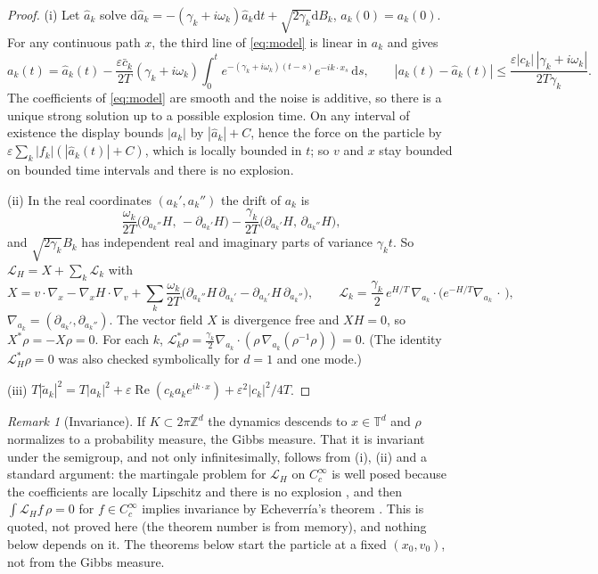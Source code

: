 \documentclass[11pt]{article}
\newcommand{\dd}{\mathrm{d}}
\newcommand{\eps}{\varepsilon}
\newcommand{\cL}{\mathcal{L}}
\renewcommand{\Re}{\operatorname{Re}}
\theoremstyle{remark}
\newtheorem{remark}[theorem]{Remark}
\begin{document}
\begin{proof}
(i) Let $\hat a_k$ solve
$\dd\hat a_k=-(\gamma_k+i\omega_k)\hat a_k\dd t+\sqrt{2\gamma_k}\dd B_k$,
$\hat a_k(0)=a_k(0)$. For any continuous path $x$, the third line of
\eqref{eq:model} is linear in $a_k$ and gives
\[
  a_k(t)=\hat a_k(t)-\frac{\eps\bar c_k}{2T}(\gamma_k+i\omega_k)
    \int_0^te^{-(\gamma_k+i\omega_k)(t-s)}e^{-ik\cdot x_s}\,\dd s ,
  \qquad
  |a_k(t)-\hat a_k(t)|\le\frac{\eps|c_k|\,|\gamma_k+i\omega_k|}{2T\gamma_k}.
\]
The coefficients of \eqref{eq:model} are smooth and the noise is additive,
so there is a unique strong solution up to a possible explosion time. On
any interval of existence the display bounds $|a_k|$ by
$|\hat a_k|+C$, hence the force on the particle by
$\eps\sum_k|f_k|(|\hat a_k(t)|+C)$, which is locally bounded in $t$; so
$v$ and $x$ stay bounded on bounded time intervals and there is no
explosion.

(ii) In the real coordinates $(a_k',a_k'')$ the drift of $a_k$ is
\[
  \frac{\omega_k}{2T}\bigl(\partial_{a_k''}H,\,-\partial_{a_k'}H\bigr)
  -\frac{\gamma_k}{2T}\bigl(\partial_{a_k'}H,\,\partial_{a_k''}H\bigr),
\]
and $\sqrt{2\gamma_k}B_k$ has independent real and imaginary parts of
variance $\gamma_kt$. So $\cL_H=X+\sum_k\cL_k$ with
\[
  X=v\cdot\nabla_x-\nabla_xH\cdot\nabla_v
    +\sum_k\frac{\omega_k}{2T}\bigl(\partial_{a_k''}H\,\partial_{a_k'}
      -\partial_{a_k'}H\,\partial_{a_k''}\bigr),
  \qquad
  \cL_k=\frac{\gamma_k}{2}\,e^{H/T}\,\nabla_{a_k}\!\cdot\!
     \bigl(e^{-H/T}\nabla_{a_k}\,\cdot\,\bigr),
\]
$\nabla_{a_k}=(\partial_{a_k'},\partial_{a_k''})$. The vector field $X$ is
divergence free and $XH=0$, so $X^*\rho=-X\rho=0$. For each $k$,
$\cL_k^*\rho=\frac{\gamma_k}{2}\nabla_{a_k}\cdot
(\rho\,\nabla_{a_k}(\rho^{-1}\rho))=0$. (The identity $\cL_H^*\rho=0$ was
also checked symbolically for $d=1$ and one mode.)

(iii) $T|\tilde a_k|^2=T|a_k|^2+\eps\Re(c_ka_ke^{ik\cdot x})
+\eps^2|c_k|^2/4T$.
\end{proof}

\begin{remark}[Invariance]\label{rem:inv}
If $K\subset2\pi\mathbb{Z}^d$ the dynamics descends to
$x\in\mathbb{T}^d$ and $\rho$ normalizes to a probability measure, the Gibbs
measure. That it is invariant under the semigroup, and not only
infinitesimally, follows from (i), (ii) and a standard argument: the
martingale problem for $\cL_H$ on $C_c^\infty$ is well posed because the
coefficients are locally Lipschitz and there is no explosion
\cite{SV}, and then $\int\cL_Hf\,\rho=0$ for $f\in C_c^\infty$ implies
invariance by Echeverr\'ia's theorem \cite[Ch.~4, Thm~9.17]{EK}. This is
quoted, not proved here (the theorem number is from memory), and nothing
below depends on it. The theorems below start the particle at a fixed
$(x_0,v_0)$, not from the Gibbs measure.
\end{remark}
\end{document}
